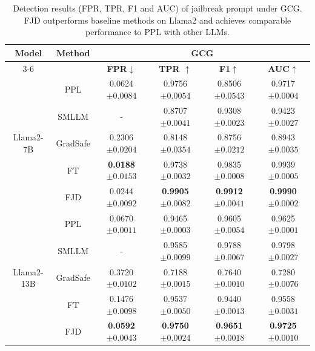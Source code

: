 \documentclass{article}
\begin{document}
\begin{table}[t]
  \caption{Detection results (FPR, TPR, F1 and AUC) of jailbreak prompt under GCG. FJD outperforms baseline methods on Llama2 and achieves comparable performance to PPL with other LLMs.}
  \label{gcg auc}

  \centering
  \setlength\tabcolsep{14pt}
  \footnotesize

  \begin{tabular}{cccccc}
    \toprule
    \multirow{2}{*}{\textbf{Model}}  &  \multirow{2}{*}{\textbf{Method}} & \multicolumn{4}{c}{\textbf{GCG}} \\
    \cmidrule(r){3-6}

    & & \textbf{FPR$\downarrow$}& \textbf{TPR $\uparrow$}& \textbf{F1$\uparrow$}&\textbf{AUC$\uparrow$}\\
    
    \midrule
    \multirow{5}{*}{Llama2-7B} 
    & PPL  & 0.0624\tiny{$\pm 0.0084$} & 0.9756\tiny{$\pm 0.0054$} & 0.8506\tiny{$\pm 0.0543$} & 0.9717\tiny{$\pm 0.0004$}  \\
    & SMLLM & - & 0.8707\tiny{$\pm 0.0041$} & 0.9308\tiny{$\pm 0.0023$} & 0.9423\tiny{$\pm 0.0027$}     \\
    & GradSafe & 0.2306\tiny{$\pm 0.0204$} & 0.8148\tiny{$\pm 0.0354$} & 0.8756\tiny{$\pm 0.0212$} & 0.8943\tiny{$\pm 0.0035$} \\
    & FT & \textbf{0.0188}\tiny{$\pm 0.0153$} & 0.9738\tiny{$\pm 0.0032$}  & 0.9835\tiny{$\pm 0.0008$} & 0.9939\tiny{$\pm 0.0005$}\\
    & FJD & 0.0244\tiny{$\pm 0.0092$} & \textbf{0.9905}\tiny{$\pm 0.0082$}  & \textbf{0.9912}\tiny{$\pm 0.0041$} & \textbf{0.9990}\tiny{$\pm 0.0002$}\\
    \midrule
    \multirow{5}{*}{Llama2-13B} 
    & PPL & 0.0670\tiny{$\pm 0.0011$} & 0.9465\tiny{$\pm 0.0003$} & 0.9605\tiny{$\pm 0.0054$} & 0.9625\tiny{$\pm 0.0001$}  \\
    & SMLLM & -& 0.9585\tiny{$\pm 0.0099$} & 0.9788\tiny{$\pm 0.0067$} & 0.9798\tiny{$\pm 0.0027$}  \\
    & GradSafe & 0.3720\tiny{$\pm 0.0102$} & 0.7188\tiny{$\pm 0.0015$} & 0.7640\tiny{$\pm 0.0010$} & 0.7280\tiny{$\pm 0.0076$} \\
    & FT & 0.1476\tiny{$\pm 0.0098$} & 0.9537\tiny{$\pm 0.0050$} & 0.9440\tiny{$\pm 0.0013$} & 0.9558\tiny{$\pm 0.0031$} \\
    & FJD & \textbf{0.0592}\tiny{$\pm 0.0043$} & \textbf{0.9750}\tiny{$\pm 0.0024$} & \textbf{0.9651}\tiny{$\pm 0.0018$} & \textbf{0.9725}\tiny{$\pm 0.0010$}  \\
    

\end{tabular}
\end{table}
\end{document}
